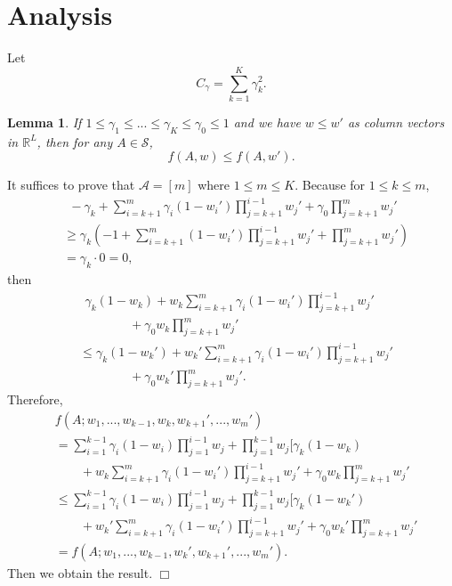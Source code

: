 \documentclass{article}
\newcommand{\cA}{\mathcal{A}}
\newcommand{\cS}{\mathcal{S}}
\newcommand{\RR}{\mathbb{R}}
\newtheorem{lemma}[theorem]{Lemma}%
\newenvironment{proof}{\noindent {\textbf{Proof. }}}{$\Box$ \medskip}
\begin{document}
	
\section{Analysis}
Let
\begin{equation}
	C_\gamma = \sum_{k=1}^{K} \gamma_k^2.
\end{equation}
	
\begin{lemma}
\label{lem:increasing} 
If $1 \leq \gamma_1 \leq ... \leq \gamma_K \leq \gamma_0 \leq 1$ and we have $w \leq w'$ as column vectors in $\RR^L$, then for any $A\in\cS$,
$$
	f(A, w) \leq f(A, w').
$$
\end{lemma}
\begin{proof}
	It suffices to prove that $\cA = [m]$ where $1 \leq m \leq K$. Because for $1 \leq k \leq m$,
	\begin{align*}
		&~~-\gamma_k + \sum_{i=k+1}^m \gamma_i(1- w_i')\prod_{j=k+1}^{i-1}w_j' + \gamma_0\prod_{j=k+1}^{m}w_j'\\
		&\geq \gamma_k (-1 + \sum_{i=k+1}^m (1- w_i')\prod_{j=k+1}^{i-1}w_j' +  \prod_{j=k+1}^{m}w_j')\\
		&=\gamma_k \cdot 0 = 0,
	\end{align*}
	then
	\begin{align*}
		&~~\gamma_k (1 - w_k) + w_k\sum_{i=k+1}^m \gamma_i(1- w_i')\prod_{j=k+1}^{i-1}w_j'\\
		&\qquad \qquad + \gamma_0 w_k\prod_{j=k+1}^{m}w_j'\\
		& \leq \gamma_k (1 - w_k') + w_k'\sum_{i=k+1}^m \gamma_i(1- w_i')\prod_{j=k+1}^{i-1}w_j'\\
		&\qquad \qquad + \gamma_0 w_k'\prod_{j=k+1}^{m}w_j'.
	\end{align*}
	Therefore, 
	\begin{align*}
		& f(A; w_1,...,w_{k-1},w_k,w_{k+1}',...,w_m')\\
		&=\sum_{i=1}^{k-1} \gamma_i(1 - w_i)\prod_{j=1}^{i-1}w_j + \prod_{j=1}^{k-1}w_j [\gamma_k (1 - w_k) \\
		&\qquad + w_k\sum_{i=k+1}^m \gamma_i(1- w_i')\prod_{j=k+1}^{i-1}w_j' + \gamma_0 w_k\prod_{j=k+1}^{m}w_j'\\
		&\leq \sum_{i=1}^{k-1} \gamma_i(1 - w_i)\prod_{j=1}^{i-1}w_j + \prod_{j=1}^{k-1}w_j [\gamma_k (1 - w_k') \\
		&\qquad + w_k'\sum_{i=k+1}^m \gamma_i(1- w_i')\prod_{j=k+1}^{i-1}w_j' + \gamma_0 w_k'\prod_{j=k+1}^{m}w_j'\\
		&=f(A; w_1,...,w_{k-1},w_{k}',w_{k+1}',...,w_m').
	\end{align*}
	Then we obtain the result.
\end{proof}
	
\end{document}
